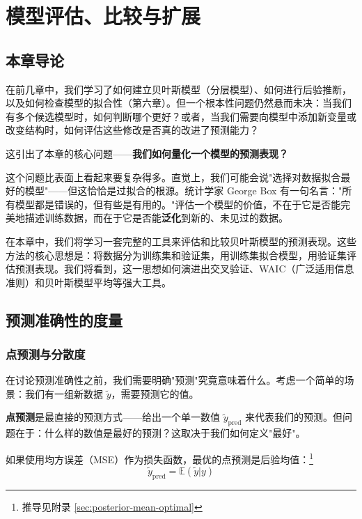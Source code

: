 
\chapter{模型评估、比较与扩展}

\section{本章导论}

在前几章中，我们学习了如何建立贝叶斯模型（分层模型）、如何进行后验推断，以及如何检查模型的拟合性（第六章）。但一个根本性问题仍然悬而未决：当我们有多个候选模型时，如何判断哪个更好？或者，当我们需要向模型中添加新变量或改变结构时，如何评估这些修改是否真的改进了预测能力？

这引出了本章的核心问题——\textbf{我们如何量化一个模型的预测表现？}

这个问题比表面上看起来要复杂得多。直觉上，我们可能会说"选择对数据拟合最好的模型"——但这恰恰是过拟合的根源。统计学家 George Box 有一句名言："所有模型都是错误的，但有些是有用的。"评估一个模型的价值，不在于它是否能完美地描述训练数据，而在于它是否能\textbf{泛化}到新的、未见过的数据。

在本章中，我们将学习一套完整的工具来评估和比较贝叶斯模型的预测表现。这些方法的核心思想是：将数据分为训练集和验证集，用训练集拟合模型，用验证集评估预测表现。我们将看到，这一思想如何演进出交叉验证、WAIC（广泛适用信息准则）和贝叶斯模型平均等强大工具。

\section{预测准确性的度量}

\subsection{点预测与分散度}

在讨论预测准确性之前，我们需要明确"预测"究竟意味着什么。考虑一个简单的场景：我们有一组新数据 $\tilde{y}$，需要预测它的值。

\textbf{点预测}是最直接的预测方式——给出一个单一数值 $\tilde{y}_{\text{pred}}$ 来代表我们的预测。但问题在于：什么样的数值是最好的预测？这取决于我们如何定义"最好"。

如果使用均方误差（MSE）作为损失函数，最优的点预测是后验均值：\footnote{推导见附录 \cref{sec:posterior-mean-optimal}}
\[
\tilde{y}_{\text{pred}} = \mathbb{E}(\tilde{y} | y)
\]

